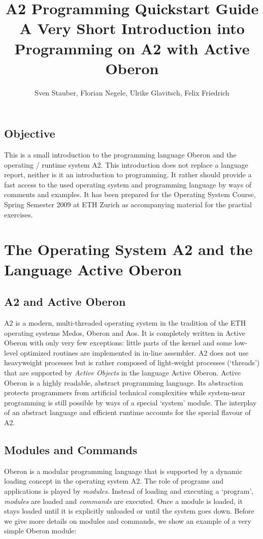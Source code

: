 \documentclass[a4paper,11pt]{article}
\begin{document}
\title{A2 Programming Quickstart Guide\\[1em] \normalsize A Very Short Introduction into Programming on A2 with Active Oberon}
\author{Sven Stauber, Florian Negele, Ulrike Glavitsch, Felix Friedrich}
\maketitle

\tableofcontents
\subsection*{Objective}
This is a small introduction to the programming language Oberon and the operating / runtime system A2. This introduction does not replace a language report, neither is it an introduction to programming. It rather should provide a fast access to the used operating system and programming language by ways of comments and examples. It has been prepared for the Operating System Course, Spring Semester 2009 at ETH Zurich as accompanying material for the practial exercises.

\section{The Operating System A2 and the Language Active Oberon}
\subsection{A2 and Active Oberon}
A2 is a modern, multi-threaded operating system in the tradition of the ETH operating systems Medos, Oberon and Aos. It is completely written in Active Oberon with only very few exceptions: little parts of the kernel and some low-level optimized routines are implemented in in-line assembler. A2 does not use heavyweight processes but is rather composed of light-weight processes (`threads') that are supported by {\em Active Objects} in the language Active Oberon. Active Oberon is a highly readable, abstract programming language. Its abstraction protects programmers from artificial technical complexities while system-near programming is still possible by ways of a special `system' module. The interplay of an abstract language and efficient runtime accounts for the special flavour of A2.

\subsection{Modules and Commands}
Oberon is a modular programming language that is supported by a dynamic loading concept in the operating system A2. The role of programs and applications is played by {\em modules}. Instead of loading and executing a `program', {\em modules} are loaded and {\em commands} are executed. Once a module is loaded, it stays loaded until it is explicitly unloaded or until the system goes down. Before we give more details on modules and commands, we show an example of a very simple Oberon module:
\end{document}
